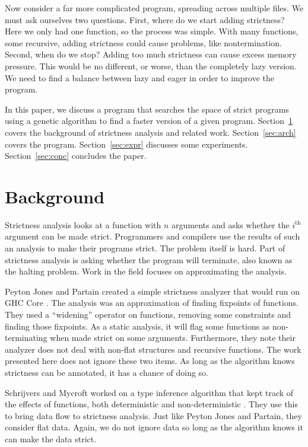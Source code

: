\documentclass[preprint,nocopyrightspace]{sigplanconf}
\begin{document}
Now consider a far more complicated program, spreading across multiple files. We must ask ourselves two questions. First, where do we start adding strictness? Here we only had one function, so the process was simple. With many functions, some recursive, adding strictness could cause problems, like nontermination. Second, when do we stop? Adding too much strictness can cause excess memory pressure. This would be no different, or worse, than the completely lazy version. We need to find a balance between lazy and eager in order to improve the program.

In this paper, we discuss a program that searches the space of strict programs using a genetic algorithm to find a faster version of a given program. Section~\ref{sec:back} covers the background of strictness analysis and related work. Section~\ref{sec:arch} covers the program. Section~\ref{sec:expr} discusses some experiments. Section~\ref{sec:conc} concludes the paper.

\section{Background}\label{sec:back}
Strictness analysis looks at a function with $n$ arguments and asks whether the $i^{\text{th}}$ argument can be made strict. Programmers and compilers use the results of such an analysis to make their programs strict. The problem itself is hard. Part of strictness analysis is asking whether the program will terminate, also known as the halting problem. Work in the field focuses on approximating the analysis.

Peyton Jones and Partain created a simple strictness analyzer that would run on GHC Core \cite{pjones}. The analysis was an approximation of finding fixpoints of functions. They used a ``widening'' operator on functions, removing some constraints and finding those fixpoints. As a static analysis, it will flag some functions as non-terminating when made strict on some arguments. Furthermore, they note their analyzer does not deal with non-flat structures and recursive functions. The work presented here does not ignore these two items. As long as the algorithm knows strictness can be annotated, it has a chance of doing so.

Schrijvers and Mycroft worked on a type inference algorithm that kept track of the effects of functions, both deterministic and non-deterministic \cite{mycroft, wadler}. They use this to bring data flow to strictness analysis. Just like Peyton Jones and Partain, they consider flat data. Again, we do not ignore data so long as the algorithm knows it can make the data strict.
\end{document}
